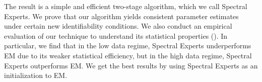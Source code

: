 






The result is a simple and efficient two-stage algorithm,
which we call Spectral Experts.
We prove that our algorithm yields consistent parameter estimates under certain
new identifiability conditions.  We also conduct an empirical evaluation
of our technique to understand its statistical properties ().
In particular, we find that in the low data regime,
Spectral Experts underperforms EM due to its weaker statistical efficiency,
but in the high data regime,
Spectral Experts outperforms EM.
We get the best results by using Spectral Experts as an initialization
to EM.

